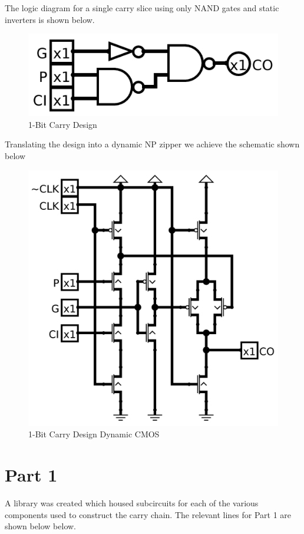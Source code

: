 \documentclass{article}
\begin{document}
\newpage
The logic diagram for a single carry slice using only NAND gates and static
inverters is shown below.

\begin{figure}[H]
    \centering
    \includegraphics[width=0.8\linewidth]{../logisim_carry_slice.png}
    \caption{1-Bit Carry Design}
\end{figure}

Translating the design into a dynamic NP zipper we achieve the schematic shown below

\begin{figure}[H]
    \centering
    \includegraphics[width=0.8\linewidth]{../logisim_carry_slice_fets.png}
    \caption{1-Bit Carry Design Dynamic CMOS}
\end{figure}

\newpage
\section*{Part 1}

A library was created which housed subcircuits for each of the various
components used to construct the carry chain. The relevant lines for Part 1 are
shown below below.
\end{document}

